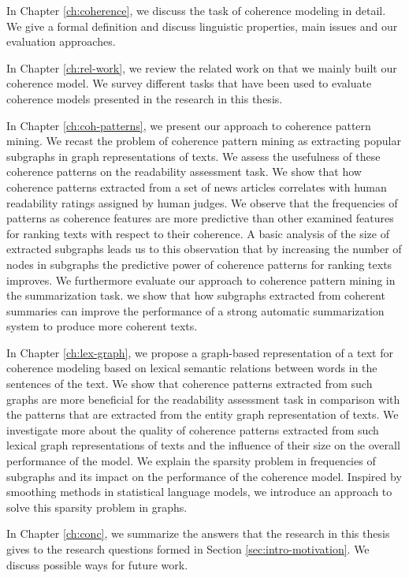 In Chapter \ref{ch:coherence}, we discuss the task of coherence modeling in detail. 
We give a formal definition and discuss linguistic properties, main issues and our evaluation approaches. 

In Chapter \ref{ch:rel-work}, we review the related work on that we mainly built our coherence model. 
We survey different tasks that have been used to evaluate coherence models presented in the research in this thesis. 

In Chapter \ref{ch:coh-patterns}, we present our approach to coherence pattern mining. 
We recast the problem of coherence pattern mining as extracting popular subgraphs in graph representations of texts. 
We assess the usefulness of these coherence patterns on the readability assessment task. 
We show that how coherence patterns extracted from a set of news articles  correlates with human readability ratings assigned by human judges. 
We observe that the frequencies of patterns as coherence features are more predictive than other examined features for ranking texts with respect to their coherence. 
A basic analysis of the size of extracted subgraphs leads us to this observation that by increasing the number of nodes in subgraphs the predictive power of coherence patterns for ranking texts improves. 
We furthermore evaluate  our approach to coherence pattern mining in the summarization task.  
we show that how subgraphs extracted from coherent summaries can improve the performance of a strong automatic summarization system to produce more coherent texts. 

In Chapter \ref{ch:lex-graph}, we propose a graph-based representation of a text for coherence modeling based on lexical semantic relations between words in the sentences of the text.  
We show that coherence patterns extracted from such graphs are more beneficial for the readability assessment task in comparison with the patterns that are extracted from the entity graph representation of texts.  
We investigate more about the quality of coherence patterns extracted from such lexical graph representations of texts and the influence of their size on the overall performance of the model.   
We explain the sparsity problem in frequencies of subgraphs and its impact on the performance of the coherence model. Inspired by smoothing methods in statistical language models, we introduce an approach to solve this sparsity problem in graphs.  

In Chapter \ref{ch:conc}, we summarize the answers that the research in this thesis gives to the research questions formed in Section \ref{sec:intro-motivation}. 
We discuss possible ways for future work. 

